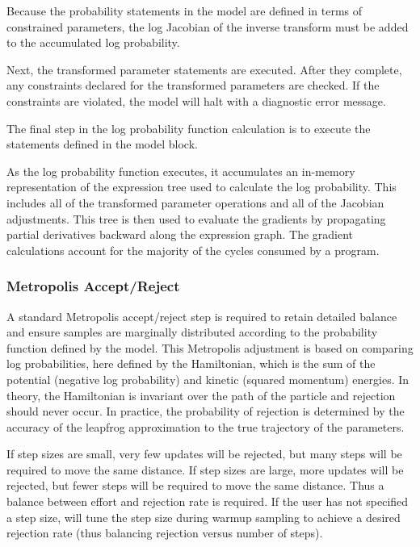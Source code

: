 \documentclass[article]{jss}
\begin{document}
Because the probability statements in the model are defined in terms
of constrained parameters, the log Jacobian of the inverse transform
must be added to the accumulated log probability.

Next, the transformed parameter statements are executed.  After they
complete, any constraints declared for the transformed parameters are
checked.  If the constraints are violated, the model will halt with a
diagnostic error message.

The final step in the log probability function calculation is to
execute the statements defined in the model block.  

As the log probability function executes, it accumulates an in-memory
representation of the expression tree used to calculate the log
probability.  This includes all of the transformed parameter
operations and all of the Jacobian adjustments.  This tree is then
used to evaluate the gradients by propagating partial derivatives
backward along the expression graph.  The gradient calculations
account for the majority of the cycles consumed by a  program.

\subsubsection{Metropolis Accept/Reject}

A standard Metropolis accept/reject step is required to retain detailed
balance and ensure samples are marginally distributed according to the
probability function defined by the model.  This Metropolis adjustment
is based on comparing log probabilities, here defined by the
Hamiltonian, which is the sum of the potential (negative log
probability) and kinetic (squared momentum) energies.  In theory, the
Hamiltonian is invariant over the path of the particle and rejection
should never occur.  In practice, the probability of rejection is
determined by the accuracy of the leapfrog approximation to the true
trajectory of the parameters.

If step sizes are small, very few updates will be rejected, but many
steps will be required to move the same distance.  If step sizes are
large, more updates will be rejected, but fewer steps will be required
to move the same distance.  Thus a balance between effort and
rejection rate is required.  If the user has not specified a step
size,  will tune the step size during warmup sampling to achieve
a desired rejection rate (thus balancing rejection versus number of
steps).
\end{document}
